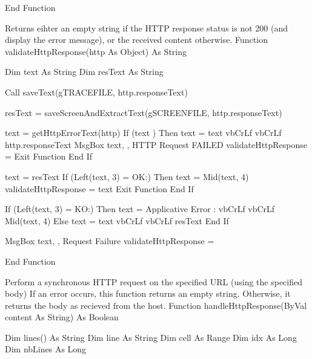 \documentclass[letterpaper,10pt,english]{sphinxmanual}
\begin{document}
\begin{sphinxVerbatim}[commandchars=\\\{\}]
End Function


\PYGZsq{} Returns eihter an empty string if the HTTP response status is not 200 (and display the error message),
\PYGZsq{} or the received content otherwise.
\PYGZsq{}
Function validateHttpResponse(http As Object) As String

   Dim text As String
   Dim resText As String

   Call saveText(g\PYGZus{}TRACE\PYGZus{}FILE, http.responseText)

   resText = saveScreenAndExtractText(g\PYGZus{}SCREEN\PYGZus{}FILE, http.responseText)

   text = getHttpErrorText(http)
   If (text \PYGZlt{}\PYGZgt{} \PYGZdq{}\PYGZdq{}) Then
      text = text \PYGZam{} vbCrLf \PYGZam{} \PYGZdq{}\PYGZus{}\PYGZus{}\PYGZus{}\PYGZus{}\PYGZus{}\PYGZus{}\PYGZus{}\PYGZus{}\PYGZus{}\PYGZus{}\PYGZus{}\PYGZus{}\PYGZus{}\PYGZus{}\PYGZus{}\PYGZus{}\PYGZus{}\PYGZus{}\PYGZus{}\PYGZus{}\PYGZus{}\PYGZus{}\PYGZus{}\PYGZus{}\PYGZus{}\PYGZus{}\PYGZus{}\PYGZdq{} \PYGZam{} vbCrLf \PYGZam{} http.responseText
      MsgBox text, , \PYGZdq{}HTTP Request FAILED\PYGZdq{}
      validateHttpResponse = \PYGZdq{}\PYGZdq{}
      Exit Function
   End If

   text = resText
   If (Left(text, 3) = \PYGZdq{}OK:\PYGZdq{}) Then
      text = Mid(text, 4)
      validateHttpResponse = text
      Exit Function
   End If

   If (Left(text, 3) = \PYGZdq{}KO:\PYGZdq{}) Then
      text = \PYGZdq{}Applicative Error :\PYGZdq{} \PYGZam{} vbCrLf \PYGZam{} vbCrLf \PYGZam{} Mid(text, 4)
   Else
      text = text \PYGZam{} vbCrLf \PYGZam{} \PYGZdq{}\PYGZus{}\PYGZus{}\PYGZus{}\PYGZus{}\PYGZus{}\PYGZus{}\PYGZus{}\PYGZus{}\PYGZus{}\PYGZus{}\PYGZus{}\PYGZus{}\PYGZus{}\PYGZus{}\PYGZus{}\PYGZus{}\PYGZus{}\PYGZus{}\PYGZus{}\PYGZus{}\PYGZus{}\PYGZus{}\PYGZus{}\PYGZus{}\PYGZus{}\PYGZus{}\PYGZus{}\PYGZdq{} \PYGZam{} vbCrLf \PYGZam{} resText
   End If

   MsgBox text, , \PYGZdq{}Request Failure\PYGZdq{}
   validateHttpResponse = \PYGZdq{}\PYGZdq{}

End Function


\PYGZsq{} Perform a synchronous HTTP request on the specified URL (using the specified body)
\PYGZsq{} If an error occurs, this function returns an empty string.
\PYGZsq{} Otherwise, it returns the body as recieved from the host.
\PYGZsq{}
Function handleHttpResponse(ByVal content As String) As Boolean

   Dim lines() As String
\PYGZsq{}    Dim line As String
   Dim cell As Range
   Dim idx As Long
   Dim nbLines As Long


\end{sphinxVerbatim}
\end{document}
